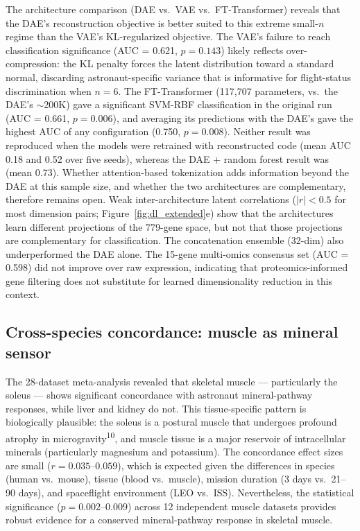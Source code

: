 \documentclass[11pt,a4paper]{article}
\begin{document}
The architecture comparison (DAE vs.\ VAE vs.\ FT-Transformer) reveals that the DAE's reconstruction objective is better suited to this extreme small-$n$ regime than the VAE's KL-regularized objective. The VAE's failure to reach classification significance (AUC = 0.621, $p = 0.143$) likely reflects over-compression: the KL penalty forces the latent distribution toward a standard normal, discarding astronaut-specific variance that is informative for flight-status discrimination when $n = 6$. The FT-Transformer (117,707 parameters, vs.\ the DAE's $\sim$200K) gave a significant SVM-RBF classification in the original run (AUC = 0.661, $p = 0.006$), and averaging its predictions with the DAE's gave the highest AUC of any configuration (0.750, $p = 0.008$). Neither result was reproduced when the models were retrained with reconstructed code (mean AUC 0.18 and 0.52 over five seeds), whereas the DAE + random forest result was (mean 0.73). Whether attention-based tokenization adds information beyond the DAE at this sample size, and whether the two architectures are complementary, therefore remains open. Weak inter-architecture latent correlations ($|r| < 0.5$ for most dimension pairs; Figure~\ref{fig:dl_extended}e) show that the architectures learn different projections of the 779-gene space, but not that those projections are complementary for classification. The concatenation ensemble (32-dim) also underperformed the DAE alone. The 15-gene multi-omics consensus set (AUC = 0.598) did not improve over raw expression, indicating that proteomics-informed gene filtering does not substitute for learned dimensionality reduction in this context.

\subsection{Cross-species concordance: muscle as mineral sensor}

The 28-dataset meta-analysis revealed that skeletal muscle --- particularly the soleus --- shows significant concordance with astronaut mineral-pathway responses, while liver and kidney do not. This tissue-specific pattern is biologically plausible: the soleus is a postural muscle that undergoes profound atrophy in microgravity\textsuperscript{10}, and muscle tissue is a major reservoir of intracellular minerals (particularly magnesium and potassium). The concordance effect sizes are small ($r = 0.035$--$0.059$), which is expected given the differences in species (human vs.\ mouse), tissue (blood vs.\ muscle), mission duration (3 days vs.\ 21--90 days), and spaceflight environment (LEO vs.\ ISS). Nevertheless, the statistical significance ($p = 0.002$--$0.009$) across 12 independent muscle datasets provides robust evidence for a conserved mineral-pathway response in skeletal muscle.
\end{document}
